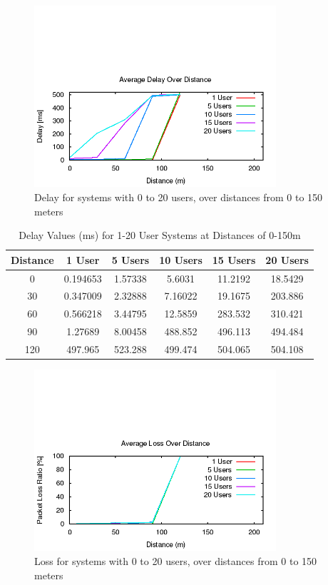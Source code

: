 \begin{figure}[H]
	\centering
	\includegraphics[width=0.8\textwidth]{images/EE500/QC/P3/Images/wifi-delay}
	\caption{Delay for systems with 0 to 20 users, over distances from 0 to
	150 meters}
	\label{fig:QCP3delay}
\end{figure}

\begin{table}[H]
	\centering
	\caption{Delay Values (ms) for 1-20 User Systems at Distances of 0-150m}
	\label{tab:QCP3TPTable}
	\begin{tabular}{|c|c|c|c|c|c|}
		\hline
		Distance & 1 User & 5 Users & 10 Users & 15 Users & 20 Users\\
		\hline
		0 & 0.194653 & 1.57338 & 5.6031 & 11.2192 & 18.5429\\
		30 & 0.347009 & 2.32888 & 7.16022 & 19.1675 & 203.886\\
		60 & 0.566218 & 3.44795 & 12.5859 & 283.532 & 310.421\\
		90 & 1.27689 & 8.00458 & 488.852 & 496.113 & 494.484\\
		120 & 497.965 & 523.288 & 499.474 & 504.065 & 504.108\\
		\hline
	\end{tabular}
\end{table}

\begin{figure}[H]
	\centering
	\includegraphics[width=0.8\textwidth]{images/EE500/QC/P3/Images/wifi-loss}
	\caption{Loss for systems with 0 to 20 users, over distances from 0 to
	150 meters}
	\label{fig:QCP3loss}
\end{figure}

